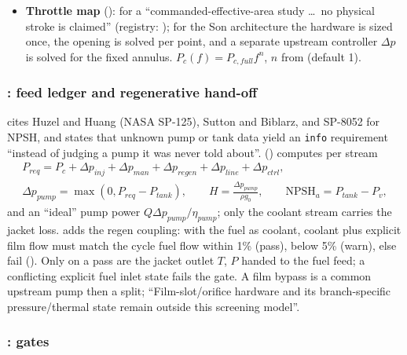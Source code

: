 \begin{itemize}
$f_{L1}=a/(2L)$, $f_{T1}=1.8412a/(\pi D)$, $f_{R1}=3.8317a/(\pi D)$; $n$--$\tau$
band $0.1<\tau f_{L1}<0.5$ with $\tau$ the development time. A real assessment
``needs the feed admittance, the combustion response function, and damping''.
\item \textbf{Throttle map} (): for  a
``commanded-effective-area study \ldots\ no physical stroke is claimed'' (registry:
); for the Son architecture the hardware
is sized once, the opening is solved per point, and a separate upstream
controller $\Delta p$ is solved for the fixed annulus. $P_c(f)=P_{c,full}f^{n}$,
$n$ from  (default 1).
\end{itemize}

\subsubsection*{: feed ledger and regenerative hand-off}

 cites Huzel and Huang (NASA SP-125), Sutton and Biblarz, and
SP-8052 for NPSH, and states that unknown pump or tank data yield an
\texttt{info} requirement ``instead of judging a pump it was never told about''.
 () computes per stream
\begin{gather*}
P_{req}=P_c+\Delta p_{inj}+\Delta p_{man}+\Delta p_{regen}+\Delta p_{line}+\Delta p_{ctrl},\\
\Delta p_{pump}=\max(0,P_{req}-P_{tank}),\qquad
H=\frac{\Delta p_{pump}}{\rho g_0},\qquad
\mathrm{NPSH}_a=P_{tank}-P_v ,
\end{gather*}
and an ``ideal'' pump power $Q\Delta p_{pump}/\eta_{pump}$; only the coolant stream
carries the jacket loss.  adds the regen coupling:
with the fuel as coolant, coolant plus explicit film flow must match the cycle fuel
flow within 1\% (pass), below 5\% (warn), else fail (). Only on a
pass are the jacket outlet $T$, $P$ handed to the fuel feed; a conflicting
explicit fuel inlet state fails the gate. A film bypass is a common upstream pump
then a split; ``Film-slot/orifice hardware and its branch-specific
pressure/thermal state remain outside this screening model''.

\subsubsection*{: gates}

